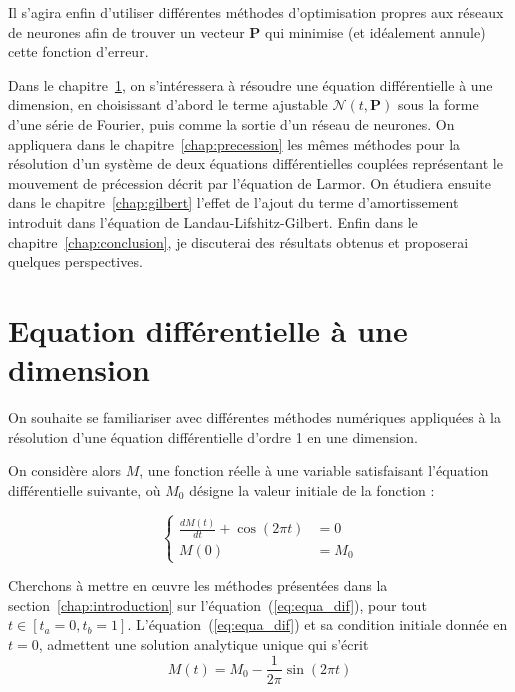 \documentclass[12pt]{report}
\begin{document}
Il s'agira enfin d'utiliser différentes méthodes d'optimisation propres aux réseaux de neurones afin de trouver un vecteur $\bm P$ qui minimise (et idéalement annule) cette fonction d'erreur.

Dans le chapitre~\ref{chap:ode_1}, on s'intéressera à résoudre une équation différentielle à une dimension, en choisissant d'abord le terme ajustable $\mathcal{N}(t,\bm{P})$ sous la forme d'une série de Fourier, puis comme la sortie d'un réseau de neurones.
On appliquera dans le chapitre~\ref{chap:precession} les mêmes méthodes pour la résolution d'un système de deux équations différentielles couplées représentant le mouvement de précession décrit par l'équation de Larmor.
On étudiera ensuite dans le chapitre~\ref{chap:gilbert} l'effet de l'ajout du terme d'amortissement introduit dans l'équation de Landau-Lifshitz-Gilbert.
Enfin dans le chapitre~\ref{chap:conclusion}, je discuterai des résultats obtenus et proposerai quelques perspectives.

\chapter{Equation différentielle à une dimension}
\label{chap:ode_1}

On souhaite se familiariser avec différentes méthodes numériques appliquées à la résolution d'une équation différentielle d'ordre 1 en une dimension.

On considère alors $M$, une fonction réelle à une variable satisfaisant l'équation différentielle suivante, où $M_0$ désigne la valeur initiale de la fonction :

\begin{equation}
    \left\{
    \begin{aligned}
        \frac{dM(t)}{dt} + \cos(2\pi t) & = 0\\
        M(0)                            & = M_0
    \end{aligned}
    \right.
    \label{eq:equa_dif}
\end{equation}

Cherchons à mettre en {\oe}uvre les méthodes présentées dans la section~\ref{chap:introduction} sur l'équation~(\ref{eq:equa_dif}), pour tout $t\in [t_a=0,t_b=1]$.
L'équation~(\ref{eq:equa_dif}) et sa condition initiale donnée en $t=0$, admettent une solution analytique unique qui s'écrit
\begin{equation}
    {M}(t) = M_0 - \frac{1}{2\pi}\sin(2\pi t)
    \label{eq:solution_analytique}
\end{equation}
\end{document}
